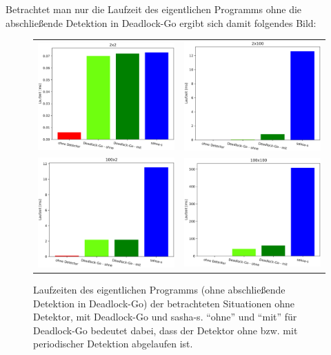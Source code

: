 Betrachtet man nur die Laufzeit des eigentlichen Programms ohne die abschließende 
Detektion in Deadlock-Go ergibt sich damit folgendes Bild:
\begin{figure}[H]
    \begin{tabular}{cc}
        \includegraphics[width=.47\textwidth]{img/2x2_runtime.eps} & \includegraphics[width=.47\textwidth]{img/2x100_runtime.eps}\\
        \includegraphics[width=.47\textwidth]{img/100x2_runtime.eps} & \includegraphics[width=.47\textwidth]{img/100x100_runtime.eps}\\
    \end{tabular}
    \caption{Laufzeiten des eigentlichen Programms (ohne abschließende Detektion 
    in Deadlock-Go) der betrachteten Situationen ohne Detektor, mit Deadlock-Go und sasha-s. ``ohne'' und ``mit''
    für Deadlock-Go bedeutet dabei, dass der Detektor ohne bzw. mit periodischer 
    Detektion abgelaufen ist.}
\end{figure}
